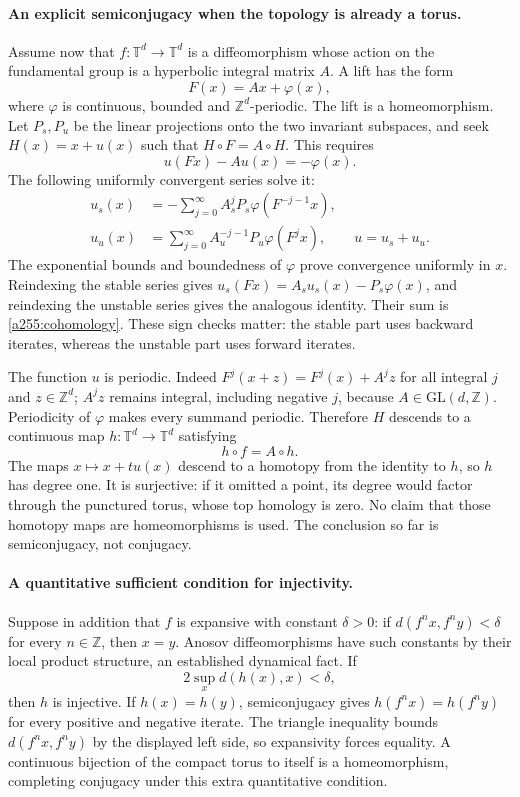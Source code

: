 \documentclass[11pt]{article}
\begin{document}
\paragraph{An explicit semiconjugacy when the topology is already a torus.}
Assume now that $f:\mathbb T^d\to\mathbb T^d$ is a diffeomorphism
whose action on the fundamental group is a hyperbolic integral matrix
$A$. A lift has the form
\[
                   F(x)=Ax+\varphi(x),
\]
where $\varphi$ is continuous, bounded and $\mathbb Z^d$-periodic.
The lift is a homeomorphism. Let $P_s,P_u$ be the linear projections
onto the two invariant subspaces, and seek $H(x)=x+u(x)$ such that
$H\circ F=A\circ H$. This requires
\begin{equation}\label{a255:cohomology}
                    u(Fx)-Au(x)=-\varphi(x).
\end{equation}
The following uniformly convergent series solve it:
\[
 \begin{split}
 u_s(x)&=-\sum_{j=0}^{\infty}
                A_s^jP_s\varphi(F^{-j-1}x),\\
 u_u(x)&=\sum_{j=0}^{\infty}
                A_u^{-j-1}P_u\varphi(F^jx),
 \qquad u=u_s+u_u.
 \end{split}
\]
The exponential bounds and boundedness of $\varphi$ prove convergence
uniformly in $x$. Reindexing the stable series gives
$u_s(Fx)=A_su_s(x)-P_s\varphi(x)$, and reindexing the unstable series
gives the analogous identity. Their sum is
\eqref{a255:cohomology}. These sign checks matter: the stable part
uses backward iterates, whereas the unstable part uses forward iterates.

The function $u$ is periodic. Indeed
$F^j(x+z)=F^j(x)+A^jz$ for all integral $j$ and $z\in\mathbb Z^d$;
$A^jz$ remains integral, including negative $j$, because
$A\in\mathrm{GL}(d,\mathbb Z)$. Periodicity of $\varphi$ makes
every summand periodic. Therefore $H$ descends to a continuous map
$h:\mathbb T^d\to\mathbb T^d$ satisfying
\[
                             h\circ f=A\circ h.
\]
The maps $x\mapsto x+t u(x)$ descend to a homotopy from the identity
to $h$, so $h$ has degree one. It is surjective: if it omitted a point,
its degree would factor through the punctured torus, whose top
homology is zero. No claim that those homotopy maps are homeomorphisms
is used. The conclusion so far is semiconjugacy, not conjugacy.

\paragraph{A quantitative sufficient condition for injectivity.}
Suppose in addition that $f$ is expansive with constant $\delta>0$:
if $d(f^n x,f^n y)<\delta$ for every $n\in\mathbb Z$, then $x=y$.
Anosov diffeomorphisms have such constants by their local product
structure, an established dynamical fact. If
\[
                    2\sup_x d(h(x),x)<\delta,
\]
then $h$ is injective. If $h(x)=h(y)$, semiconjugacy gives
$h(f^n x)=h(f^n y)$ for every positive and negative iterate. The
triangle inequality bounds $d(f^n x,f^n y)$ by the displayed left
side, so expansivity forces equality. A continuous bijection of the
compact torus to itself is a homeomorphism, completing conjugacy under
this extra quantitative condition.
\end{document}
